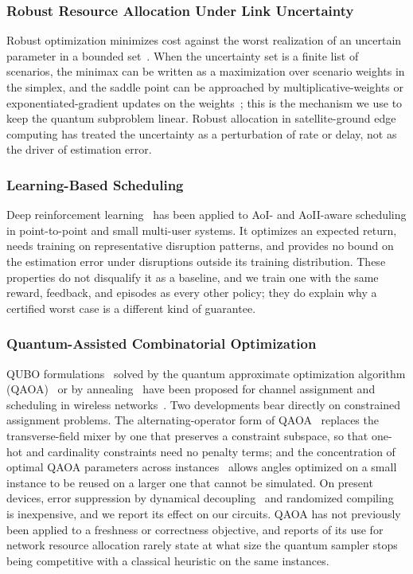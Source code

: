 \subsubsection{Robust Resource Allocation Under Link Uncertainty}
Robust optimization minimizes cost against the worst realization of an uncertain parameter in a bounded
set~\cite{BenTal2009, Bertsimas2004}. When the uncertainty set is a finite list of scenarios, the minimax can be
written as a maximization over scenario weights in the simplex, and the saddle point can be approached by
multiplicative-weights or exponentiated-gradient updates on the weights~\cite{Arora2012}; this is the mechanism we use
to keep the quantum subproblem linear. Robust allocation in satellite-ground edge computing has treated the
uncertainty as a perturbation of rate or delay, not as the driver of estimation error.

\subsubsection{Learning-Based Scheduling}
Deep reinforcement learning~\cite{Mnih2015, Schulman2017} has been applied to AoI- and AoII-aware scheduling in
point-to-point and small multi-user systems. It optimizes an expected return, needs training on representative
disruption patterns, and provides no bound on the estimation error under disruptions outside its training
distribution. These properties do not disqualify it as a baseline, and we train one with the same reward, feedback,
and episodes as every other policy; they do explain why a certified worst case is a different kind of guarantee.

\subsubsection{Quantum-Assisted Combinatorial Optimization}
QUBO formulations~\cite{Lucas2014, Glover2019} solved by the quantum approximate optimization algorithm
(QAOA)~\cite{Farhi2014, Cerezo2021} or by annealing~\cite{Albash2018} have been proposed for channel assignment and
scheduling in wireless networks~\cite{Kim2019}. Two developments bear directly on constrained assignment problems.
The alternating-operator form of QAOA~\cite{Hadfield2019} replaces the transverse-field mixer by one that preserves a
constraint subspace, so that one-hot and cardinality constraints need no penalty terms; and the concentration of
optimal QAOA parameters across instances~\cite{Brandao2018} allows angles optimized on a small instance to be reused
on a larger one that cannot be simulated. On present devices, error suppression by dynamical
decoupling~\cite{Viola1999} and randomized compiling~\cite{Wallman2016} is inexpensive, and we report its effect on our
circuits. QAOA has not previously been applied to a freshness or correctness objective, and reports of its use for
network resource allocation rarely state at what size the quantum sampler stops being competitive with a classical
heuristic on the same instances.


